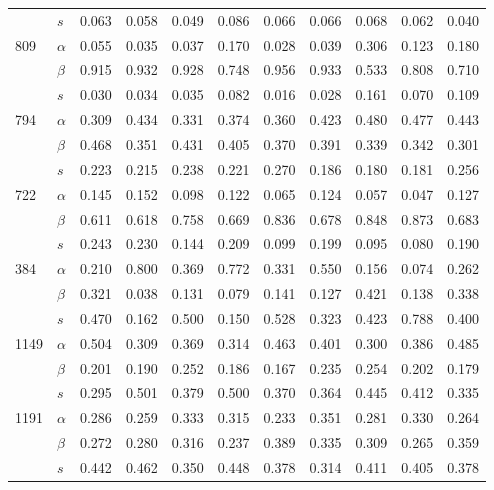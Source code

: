 \begin{longtable}{llrrrrrrrrr}
     & $s$ & 0.063 & 0.058 & 0.049 & 0.086 & 0.066 & 0.066 & 0.068 & 0.062 & 0.040 \\
\cline{1-11}
\multirow{3}{*}{809} & $\alpha$ & 0.055 & 0.035 & 0.037 & 0.170 & 0.028 & 0.039 & 0.306 & 0.123 & 0.180 \\
     & $\beta$ & 0.915 & 0.932 & 0.928 & 0.748 & 0.956 & 0.933 & 0.533 & 0.808 & 0.710 \\
     & $s$ & 0.030 & 0.034 & 0.035 & 0.082 & 0.016 & 0.028 & 0.161 & 0.070 & 0.109 \\
\cline{1-11}
\multirow{3}{*}{794} & $\alpha$ & 0.309 & 0.434 & 0.331 & 0.374 & 0.360 & 0.423 & 0.480 & 0.477 & 0.443 \\
     & $\beta$ & 0.468 & 0.351 & 0.431 & 0.405 & 0.370 & 0.391 & 0.339 & 0.342 & 0.301 \\
     & $s$ & 0.223 & 0.215 & 0.238 & 0.221 & 0.270 & 0.186 & 0.180 & 0.181 & 0.256 \\
\cline{1-11}
\multirow{3}{*}{722} & $\alpha$ & 0.145 & 0.152 & 0.098 & 0.122 & 0.065 & 0.124 & 0.057 & 0.047 & 0.127 \\
     & $\beta$ & 0.611 & 0.618 & 0.758 & 0.669 & 0.836 & 0.678 & 0.848 & 0.873 & 0.683 \\
     & $s$ & 0.243 & 0.230 & 0.144 & 0.209 & 0.099 & 0.199 & 0.095 & 0.080 & 0.190 \\
\cline{1-11}
\multirow{3}{*}{384} & $\alpha$ & 0.210 & 0.800 & 0.369 & 0.772 & 0.331 & 0.550 & 0.156 & 0.074 & 0.262 \\
     & $\beta$ & 0.321 & 0.038 & 0.131 & 0.079 & 0.141 & 0.127 & 0.421 & 0.138 & 0.338 \\
     & $s$ & 0.470 & 0.162 & 0.500 & 0.150 & 0.528 & 0.323 & 0.423 & 0.788 & 0.400 \\
\cline{1-11}
\multirow{3}{*}{1149} & $\alpha$ & 0.504 & 0.309 & 0.369 & 0.314 & 0.463 & 0.401 & 0.300 & 0.386 & 0.485 \\
     & $\beta$ & 0.201 & 0.190 & 0.252 & 0.186 & 0.167 & 0.235 & 0.254 & 0.202 & 0.179 \\
     & $s$ & 0.295 & 0.501 & 0.379 & 0.500 & 0.370 & 0.364 & 0.445 & 0.412 & 0.335 \\
\cline{1-11}
\multirow{3}{*}{1191} & $\alpha$ & 0.286 & 0.259 & 0.333 & 0.315 & 0.233 & 0.351 & 0.281 & 0.330 & 0.264 \\
     & $\beta$ & 0.272 & 0.280 & 0.316 & 0.237 & 0.389 & 0.335 & 0.309 & 0.265 & 0.359 \\
     & $s$ & 0.442 & 0.462 & 0.350 & 0.448 & 0.378 & 0.314 & 0.411 & 0.405 & 0.378 \\

\end{longtable}
